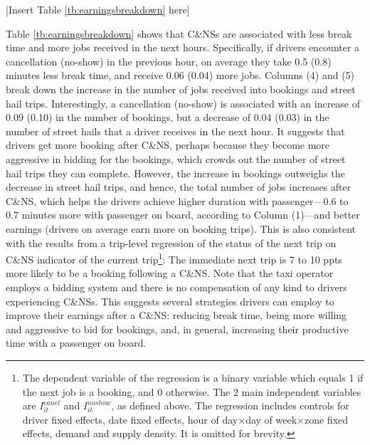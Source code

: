 \documentclass[reviewmode]{restud}
\begin{document}
\begin{center}
	[Insert Table \ref{tb:earningsbreakdown} here]
\end{center}

Table \ref{tb:earningsbreakdown} shows that C\&NSs are associated with less break time and more jobs received in the next hours. Specifically, if drivers encounter a cancellation (no-show) in the previous hour, on average they take 0.5 (0.8) minutes less break time, and receive 0.06 (0.04) more jobs. Columns (4) and (5) break down the increase in the number of jobs received into bookings and street hail trips. Interestingly, a cancellation (no-show) is associated with an increase of 0.09 (0.10) in the number of bookings, but a decrease of 0.04 (0.03) in the number of street hails that a driver receives in the next hour. It suggests that drivers get more booking after C\&NS, perhaps because they become more aggressive in bidding for the bookings, which crowds out the number of street hail trips they can complete. However, the increase in bookings outweighs the decrease in street hail trips, and hence, the total number of jobs increases after C\&NS, which helps the drivers achieve higher duration with passenger---0.6 to 0.7 minutes more with passenger on board, according to Column (1)---and better earnings (drivers on average earn more on booking trips). This is also consistent with the results from a trip-level regression of the status of the next trip on C\&NS indicator of the current trip\footnote{The dependent variable of the regression is a binary variable which equals 1 if the next job is a booking, and 0 otherwise. The 2 main independent variables are $I_{it}^{canel}$ and $I_{it}^{noshow}$, as defined above. The regression includes controls for driver fixed effects, date fixed effects, hour of day\(\times\)day of week\(\times\)zone fixed effects, demand and supply density. It is omitted for brevity.}: The immediate next trip is 7 to 10 ppts more likely to be a booking following a C\&NS. Note that the taxi operator employs a bidding system and there is no compensation of any kind to drivers experiencing C\&NSs. 
This suggests several strategies drivers can employ to improve their earnings after a C\&NS: reducing break time, being more willing and aggressive to bid for bookings, and, in general, increasing their productive time with a passenger on board.
\end{document}
